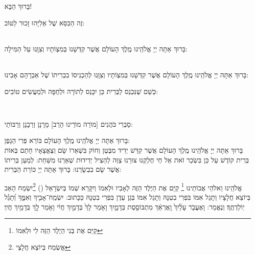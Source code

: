 \documentclass[twoside, openany, parskip=half, 11pt]{book}
\begin{document}
\begin{Large}
בָּרוּךְ הַבָּא!

\end{Large}

זֶה הַכִּסֵּא שֶׁל אֵלִיָּהוּ זָכוּר לַטּוֹב:


\\
בָּרוּךְ אַתָּה יְיָ אֱלֹהֵֽינוּ מֶֽלֶךְ הָעוֹלָם  אֲשֶׁר קִדְּשָׁנוּ בְּמִצְוֹתָיו  וְצִוָּֽנוּ עַל הַמִּילָה:

\\
בָּרוּךְ אַתָּה יְיָ אֱלֹהֵֽינוּ מֶֽלֶךְ הָעוֹלָם  אֲשֶׁר קִדְּשָׁנוּ בְּמִצְוֹתָיו וְצִוָּֽנוּ לְהַכְנִיסוֹ בִבְרִיתוֹ שֶׁל אַבְרָהָם אָבִינוּ:

\kahal
כְּשֵׁם שֶׁנִּכְנַס לַבְּרִית  כֵּן יִכָּנֵס לְתוֹרָה וּלְחֻפָּה וּלְמַעֲשִׂים טוֹבִים:

\\
\begin{footnotesize}
סַבְרִי כֹּהֲנִים [מוׂרֵה מוׂרֵינוּ הָרַב] מָרָנָן וְרַבָנָן וְרַבּוׂתַי:\\
\end{footnotesize}
בָּרוּךְ אַתָּה יְיָ אֱלֹהֵֽינוּ מֶֽלֶךְ הָעוֹלָם בּוֹרֵא פְּרִי הַגָפֶן:\\
בָּרוּךְ אַתָּה יְיָ אֱלֹהֵֽינוּ מֶֽלֶךְ הָעוֹלָם  אֲשֶׁר קִדַּשׁ יְדִיד מִבֶּטֶן  וְחוֹק בִּשְׁאֵרוֹ שָׂם  וְצֶאֱצָאָיו חָתַם בְּאוֹת בְּרִית קוֹדֶשׁ  עַל כֵּן בִּשְׂכַר זֹאת  אֵל חַי  חֶלְקֵנוּ צוּרֵנוּ  צַוֵּה לְהַצִיל יְדִידוּת שְׁאֵרֵנוּ מִשַּׁחַת: לְמַעַן בְּרִיתוֹ אֲשֶׁר שָׂם בִבְשָׂרֵנוּ: בָּרוּךְ אַתָּה יְיָ כּוֹרֵת הַבְּרִית:

אֱלֹהֵֽינוּ וֵאלֹהֵי אֲבוֹתֵינוּ \footnote{ 
קַיֵּם אֶת בְּנִי הַיֶלֶד הַזֶּה לִי וּלְאִמוֹ} קַיֵּם אֶת הַיֶּלֶד הַזֶּה לְאָבִיו וּלְאִמוֹ וְיִקָּרֵא שְׁמוֹ בְּיִשְׂרָאֵל () \footnote{ 
אֱשְׂמַח בְּיוֹצֵא חֲלָצַי}יִשְׂמַח הָאַב בְּיוֹצֵא חֲלָצָיו וְתָגֵל אִמּוֹ בִּפְרִי בִטְנָהּ וְתָגֵל אִמּוֹ בְּגַן עֵדֶן בִּפְרִי בִטְנָהּ  
כַּכָּתוּב: יִשְׂמַֽח־אָבִ֥יךָ וְאִמֶּ֑ךָ וְ֝תָגֵ֗ל יֽוֹלַדְתֶּֽךָ׃ 
וְנֶאֱמַר: וָאֶעֱבֹ֤ר עָלַ֨יִךְ֙ וָֽאֶרְאֵ֔ךְ מִתְבּוֹסֶ֖סֶת בְּדָמָ֑יִךְ 
וָאֹ֤מַר לָךְ֙ בְּדָמַ֣יִךְ חֲיִ֔י וָאֹ֥מַר לָ֖ךְ בְּדָמַ֥יִךְ חֲיִֽי׃
\end{document}

